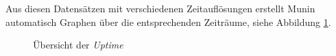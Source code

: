 Aus diesen Datensätzen mit verschiedenen Zeitauflösungen erstellt Munin automatisch Graphen über die entsprechenden Zeiträume, siehe Abbildung \ref{all4}.

\begin{figure}[ht]
	\centering
		\caption{Übersicht der \textit{Uptime}}
		\label{all4}
\end{figure}